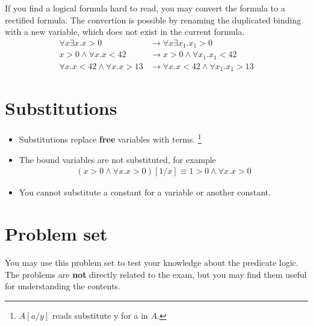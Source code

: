 \documentclass[12pt]{article}
\begin{document}
\begin{enumerate}
    If you find a logical formula hard to read,
    you may convert the formula to a rectified formula. The convertion is possible by renaming the duplicated binding 
    with a new variable, which does not exist in the current formula.
    \begin{align*}
        \forall x \exists x. x > 0 &\longrightarrow \forall x \exists x_1. x_1 > 0\\
        x > 0 \land \forall x. x < 42 &\longrightarrow x > 0 \land \forall x_1. x_1 < 42\\
        \forall x. x < 42 \land \forall x. x > 13 &\longrightarrow \forall x. x < 42 \land \forall x_1. x_1 > 13
    \end{align*}
\end{enumerate}

\section*{Substitutions}
\begin{itemize}
    \item Substitutions replace \textbf{free} variables with terms. \footnote{$A[a/y]$ reads substitute y for a in $A$.}
    \item The bound variables are not substituted, for example
    \begin{align*}
        (x > 0 \land \forall x. x > 0)[1/x] \equiv 1 > 0 \land \forall x.  x > 0
    \end{align*}
    \item You cannot substitute a constant for a variable or another constant.
\end{itemize}

\section*{Problem set}
You may use this problem set to test your knowledge about the predicate logic. The problems are 
\textbf{not} directly related to the exam, but you may find them useful for understanding 
the contents.
\end{document}
